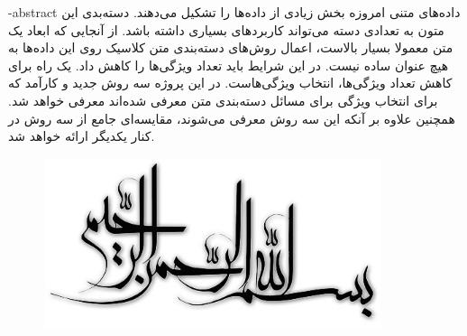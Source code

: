 \department{}

\fa-abstract{
داده‌های متنی امروزه بخش زیادی از داده‌ها را تشکیل می‌دهند. دسته‌بدی این متون به تعدادی دسته می‌تواند کاربردهای بسیاری داشته باشد. از آنجایی که ابعاد یک متن معمولا بسیار بالاست، اعمال روش‌های دسته‌بندی متن کلاسیک روی این داده‌ها به هیچ عنوان ساده نیست. در این شرایط باید تعداد ویژگی‌ها را کاهش داد. یک راه برای کاهش تعداد ویژگی‌ها، انتخاب ویژگی‌هاست. در این پروژه سه روش جدید و کارآمد که برای انتخاب ویژگی برای مسائل دسته‌بندی متن معرفی شده‌اند معرفی خواهد شد. همچنین علاوه بر آنکه این سه روش معرفی می‌شوند، مقایسه‌ای جامع از سه روش در کنار یکدیگر ارائه خواهد شد.
}





\AUTtitle
\vspace*{7cm}
\thispagestyle{empty}
\begin{center}
\includegraphics[height=5cm,width=12cm]{besm}
\end{center}
